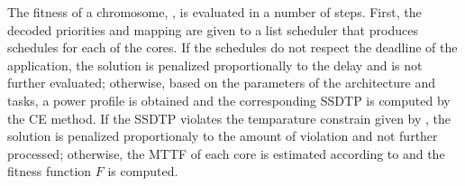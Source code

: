 The fitness of a chromosome, , is evaluated in a number of steps. First, the decoded priorities and mapping are given to a list scheduler that produces schedules for each of the cores. If the schedules do not respect the deadline of the application, the solution is penalized proportionally to the delay and is not further evaluated; otherwise, based on the parameters of the architecture and tasks, a power profile is obtained and the corresponding SSDTP is computed by the CE method. If the SSDTP violates the temparature constrain given by , the solution is penalized proportionaly to the amount of violation and not further processed; otherwise, the MTTF of each core is estimated according to  and the fitness function $F$ is computed.

